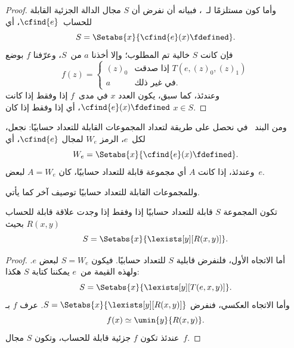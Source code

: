 \documentclass[../../../include/open-logic-section]{subfiles}
\begin{document}
\begin{proof}
وأما كون  مستلزمًا لـ~، فبيانه أن نفرض
أن $S$ مجال الدالة الجزئية القابلة للحساب~$\cfind{e}$، أي
\[
S = \Setabs{x}{\cfind{e}(x) \fdefined}.
\]
فإن كانت $S$ خالية تم المطلوب؛ وإلا أخذنا $a$ من~$S$، وعرّفنا $f$ بوضع
\[
f(z) = \begin{cases}
(z)_0 & \text{إذا صدقت $T(e,(z)_0,(z)_1)$} \\
a & \text{في غير ذلك.}
\end{cases}
\]
وعندئذ، كما سبق، يكون العدد $x$ في مدى~$f$ إذا وفقط إذا كانت
$\cfind{e}(x)\fdefined$، أي إذا وفقط إذا كان $x\in S$.
\end{proof}

ومن البند~ في  نحصل على طريقة
لتعداد المجموعات القابلة للتعداد حسابيًا: نجعل، لكل~$e$، الرمز $W_e$ لمجال
$\cfind{e}$، أي
\[
W_e = \Setabs{x}{\cfind{e}(x) \fdefined}.
\]
وعندئذ، إذا كانت $A$ أي مجموعة قابلة للتعداد حسابيًا، كان
$A=W_e$ لبعض~$e$.

وللمجموعات القابلة للتعداد حسابيًا توصيف آخر كما يأتي.

\begin{thm}
تكون المجموعة $S$ قابلة للتعداد حسابيًا إذا وفقط إذا وجدت علاقة قابلة
للحساب $R(x,y)$ بحيث
\[
S = \Setabs{ x }{ \lexists[y][R(x,y)] }.
\]
\end{thm}

\begin{proof}
أما الاتجاه الأول، فلنفرض قابلية $S$ للتعداد حسابيًا. فيكون
$S=W_e$ لبعض $e$. ولهذه القيمة من~$e$ يمكننا كتابة $S$ هكذا:
\[
S = \Setabs{ x }{ \lexists[y][T(e, x, y)] }.
\]
وأما الاتجاه العكسي، فنفرض
$S=\Setabs{x}{\lexists[y][R(x,y)]}$. عرف $f$ بـ
\[
f(x) \simeq \umin{y}{R(x, y)}.
\]
عندئذ تكون $f$ جزئية قابلة للحساب، وتكون $S$ مجال~$f$.
\end{proof}
\end{document}
